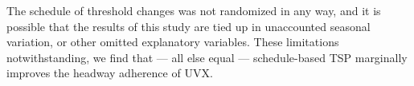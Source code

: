 \documentclass[3p, authoryear, review]{elsarticle} %
\begin{document}
The schedule of threshold changes was not randomized in any way,
and it is possible that the results of this study are tied up in unaccounted
seasonal variation, or other omitted explanatory variables. These limitations
notwithstanding, we find that --- all else equal --- schedule-based TSP
marginally improves the headway adherence of UVX.


\end{document}
